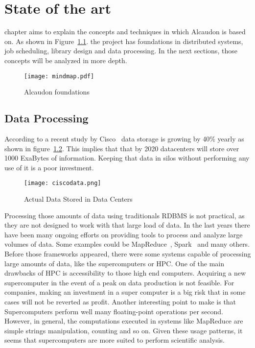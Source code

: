 \chapter{State of the art}
\label{chap:stateoftheart}

 chapter aims to explain the concepts and techniques in which
Alcaudon is based on. As shown in Figure~\ref{fig:mindmap}. the project has foundations in
distributed systems, job scheduling, library design and data processing. In the
next sections, those concepts will be analyzed in more depth.

\begin{figure}[!h]
\begin{center}
\texttt{[image: mindmap.pdf]}
\caption{Alcaudon foundations}
\label{fig:mindmap}
\end{center}
\end{figure}

\section{Data Processing}

According to a recent study by Cisco~\cite{ciscosurvey} data storage is growing
by 40\% yearly as shown in figure~\ref{fig:ciscodata}. This implies that that by
2020 datacenters will store over 1000 ExaBytes of information. Keeping that data
in silos without performing any use of it is a poor investment.

\begin{figure}[!h]
\begin{center}
\texttt{[image: ciscodata.png]}
\caption{Actual Data Stored in Data Centers~\cite{ciscosurvey}}
\label{fig:ciscodata}
\end{center}
\end{figure}

Processing those amounts of data using traditionals RDBMS is not practical, as
they are not designed to work with that large load of data. In the last years
there have been many ongoing efforts on providing tools to process and analyze
large volumes of data. Some examples could be MapReduce~\cite{mapreduce},
Spark~\cite{spark} and many others. Before those frameworks appeared, there were
some systems capable of processing large amounts of data, like the
supercomputers or HPC. One of the main drawbacks of HPC is accessibility to
those high end computers. Acquiring a new supercomputer in the event of a peak
on data production is not feasible. For companies, making an investment in a
super computer is a big risk that in some cases will not be reverted as profit.
Another interesting point to make is that Supercomputers perform well many
floating-point operations per second. However, in general, the computations
executed in systems like MapReduce are simple strings manipulation, counting and
so on. Given these usage patterns, it seems that supercomputers are more suited
to perform scientific analysis.

